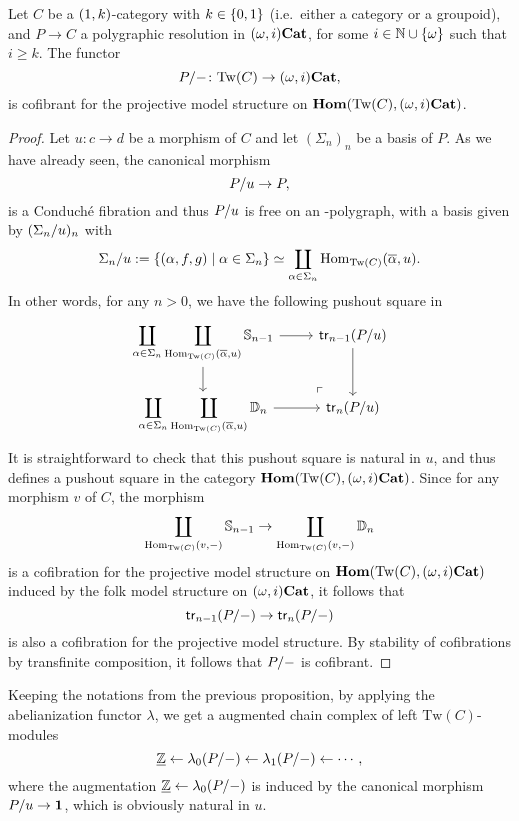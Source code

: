 \documentclass{amsart}
\newcommand{\Tw}[1]{\mathrm{Tw}(#1)}
\renewcommand{\homset}[3]{\mathrm{Hom}_{#1}(#2,#3)}
\begin{document}
  \begin{proposition}\label{prop:cofprojresol}
    Let $C$ be a $(1,k)$\nbd-category with $k \in \left\{0,1\right\}$
    (i.e.\ either a category or a groupoid), and $P \to C$ a
    polygraphic resolution in $(\omega,i)\mathbf{Cat}$, for some $i\in
    \mathbb N\cup\left\{\omega\right\}$ such that $i\geq k$. The functor
    \[
      \tr{P}{-} \colon \Tw{C} \to \opCat{i},
    \]
   is cofibrant for the projective model structure on $\fun{\Tw{C}}{\opCat{i}}$.
  \end{proposition}
  \begin{proof}
    Let $u\colon c \to d$ be a morphism of $C$ and let $(\Sigma_n)_n$
    be a basis of $P$. As we have already seen, the canonical morphism
    \[
      P/u \to P,
    \]
    is a Conduché fibration and thus $P/u$ is free on an
    \nbd-polygraph, with a basis given by $(\Sigma_n/u)_n$
    with
    \[
      \tr{\Sigma_n}{u}:=\setof{(\alpha,f,g)}{\alpha \in
        \Sigma_n}\simeq \coprod_{\alpha \in \Sigma_n}\homset{\Tw{C}}{\overline{\alpha}}{u}.
    \]
    In other words, for any $n > 0$, we have the following pushout
    square in 
    \[
      \begin{tikzcd}
        \displaystyle\coprod_{\alpha \in \Sigma_n}\coprod_{\homset{\Tw{C}}{\overline{\alpha}}{u}}\Sph{n-1} \ar[r]\ar[d] &
        \trk{n-1}(\tr{P}{u}) \ar[d] \\
            \displaystyle \coprod_{\alpha \in \Sigma_n}\coprod_{\homset{\Tw{C}}{\overline{\alpha}}{u}}\Dsk{n} \ar[r] &
            \trk{n}(\tr{P}{u})
            \ar[from=1-1,to=2-2, phantom, very near end,"\ulcorner"]
      \end{tikzcd}
    \]
    It is straightforward to check that this pushout square is
    natural in $u$, and thus defines a pushout square in the category
    $\fun{\Tw{C}}{\opCat{i}}$. Since for any morphism $v$ of $C$, the morphism
    \[
      \coprod_{\homset{\Tw{C}}{v}{-}}\Sph{n-1}\to \coprod_{\homset{\Tw{C}}{v}{-}}\Dsk{n}
    \]
    is a cofibration for the projective model structure on
    $\fun{\Tw{C}}{\opCat{i}}$ induced by the folk model structure on
    $(\omega,i)\mathbf{Cat}$, it follows that
    \[
      \mathsf{tr}_{n-1}(P/-) \to \mathsf{tr}_{n}(P/-)
    \]
    is also a cofibration for the projective model structure. By
    stability of cofibrations by transfinite composition, it follows
    that $P/-$ is cofibrant.
  \end{proof}
  \begin{paragr}
    Keeping the notations from the previous proposition, by applying
    the abelianization functor $\lambda$, we get a augmented chain
    complex of left $\Tw{C}$\nbd-modules
    \[
      \underline{\mathbb Z} \leftarrow \lambda_0(P/-) \leftarrow
      \lambda_1(P/-) \leftarrow \cdots,
    \]
    where the augmentation $\underline{\mathbb Z} \leftarrow \lambda_0(P/-)$
    is induced by the canonical morphism $P/u \to \mathbf{1}$, which
    is obviously natural in $u$.
  \end{paragr}
\end{document}
